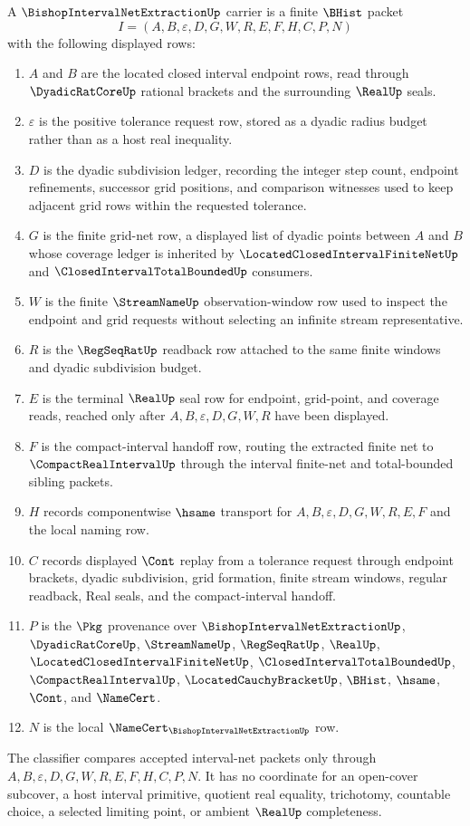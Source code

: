 \begin{definition}
\label{def:bishop-interval-net-extraction}
A $\BishopIntervalNetExtractionUp$ carrier is a finite $\BHist$ packet
$$
I=(A,B,\varepsilon,D,G,W,R,E,F,H,C,P,N)
$$
with the following displayed rows:
\begin{enumerate}
\item $A$ and $B$ are the located closed interval endpoint rows, read through $\DyadicRatCoreUp$ rational brackets and the surrounding $\RealUp$ seals.
\item $\varepsilon$ is the positive tolerance request row, stored as a dyadic radius budget rather than as a host real inequality.
\item $D$ is the dyadic subdivision ledger, recording the integer step count, endpoint refinements, successor grid positions, and comparison witnesses used to keep adjacent grid rows within the requested tolerance.
\item $G$ is the finite grid-net row, a displayed list of dyadic points between $A$ and $B$ whose coverage ledger is inherited by $\LocatedClosedIntervalFiniteNetUp$ and $\ClosedIntervalTotalBoundedUp$ consumers.
\item $W$ is the finite $\StreamNameUp$ observation-window row used to inspect the endpoint and grid requests without selecting an infinite stream representative.
\item $R$ is the $\RegSeqRatUp$ readback row attached to the same finite windows and dyadic subdivision budget.
\item $E$ is the terminal $\RealUp$ seal row for endpoint, grid-point, and coverage reads, reached only after $A,B,\varepsilon,D,G,W,R$ have been displayed.
\item $F$ is the compact-interval handoff row, routing the extracted finite net to $\CompactRealIntervalUp$ through the interval finite-net and total-bounded sibling packets.
\item $H$ records componentwise $\hsame$ transport for $A,B,\varepsilon,D,G,W,R,E,F$ and the local naming row.
\item $C$ records displayed $\Cont$ replay from a tolerance request through endpoint brackets, dyadic subdivision, grid formation, finite stream windows, regular readback, Real seals, and the compact-interval handoff.
\item $P$ is the $\Pkg$ provenance over $\BishopIntervalNetExtractionUp$, $\DyadicRatCoreUp$, $\StreamNameUp$, $\RegSeqRatUp$, $\RealUp$, $\LocatedClosedIntervalFiniteNetUp$, $\ClosedIntervalTotalBoundedUp$, $\CompactRealIntervalUp$, $\LocatedCauchyBracketUp$, $\BHist$, $\hsame$, $\Cont$, and $\NameCert$.
\item $N$ is the local $\NameCert_{\BishopIntervalNetExtractionUp}$ row.
\end{enumerate}
The classifier compares accepted interval-net packets only through $A,B,\varepsilon,D,G,W,R,E,F,H,C,P,N$. It has no coordinate for an open-cover subcover, a host interval primitive, quotient real equality, trichotomy, countable choice, a selected limiting point, or ambient $\RealUp$ completeness.
\end{definition}
